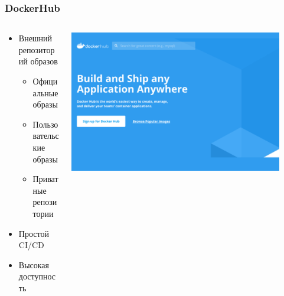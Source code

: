 \documentclass[xetex,mathserif,serif]{beamer}
\begin{document}
    \begin{frame}
        \frametitle{DockerHub}
        \begin{columns}
            \begin{column}{0.5\textwidth}
                \begin{itemize}
                    \item Внешний репозиторий образов
                    \begin{itemize}
                        \item Официальные образы
                        \item Пользовательские образы
                        \item Приватные репозитории
                    \end{itemize}
                    \item Простой CI/CD
                    \item Высокая доступность
                \end{itemize}
            \end{column}
            \begin{column}{0.5\textwidth}
                \includegraphics[width=0.9\textwidth]{dockerHub.png}
            \end{column}
        \end{columns}
    \end{frame}
\end{document}
